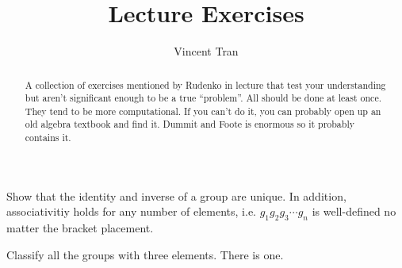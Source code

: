 \documentclass{amsart}
\title{Lecture Exercises}
\author{Vincent Tran}
\begin{document}
\begin{abstract}
	A collection of exercises mentioned by Rudenko in lecture that test your understanding but aren't significant enough to be a true ``problem''.
	All should be done at least once.
	They tend to be more computational.
	If you can't do it, you can probably open up an old algebra textbook and find it.
	Dummit and Foote is enormous so it probably contains it.
\end{abstract}

\maketitle

\begin{exercise}
	Show that the identity and inverse of a group are unique.
	In addition, associativitiy holds for any number of elements, i.e. $g_{1}g_{2}g_{3}\cdots g_n $ is well-defined no matter the bracket placement.
\end{exercise}

\begin{exercise}
	Classify all the groups with three elements.
	\ifhint
		There is one.
	\fi
\end{exercise}
\end{document}
